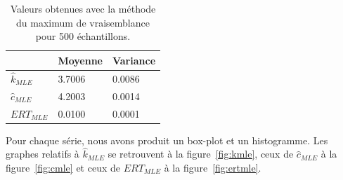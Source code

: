 \begin{table}[!ht]
\centering
\begin{tabular}{|l|l|l|}
\hline
				& Moyenne 	& Variance\\
\hline
$\hat{k}_{MLE}$ & 3.7006 	& 0.0086\\
$\hat{c}_{MLE}$ & 4.2003 	& 0.0014\\
$ERT_{MLE}$			& 0.0100	& 0.0001\\
\hline
\end{tabular}
\caption{Valeurs obtenues avec la méthode du maximum de vraisemblance pour 500 échantillons.}
\label{table:mle}
\end{table}

Pour chaque série, nous avons produit un box-plot et un histogramme. Les graphes relatifs à $\hat{k}_{MLE}$ se retrouvent à la figure~\ref{fig:kmle}, ceux de $\hat{c}_{MLE}$ à la figure~\ref{fig:cmle} et ceux de $ERT_{MLE}$ à la figure~\ref{fig:ertmle}.


